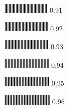 \documentclass{article}
\begin{document}
%
%
%
%



%
%
%
%



%
%

\includegraphics[width=0.91in]{bw_interlaced_horizontal.png} 0.91

\includegraphics[width=0.92in]{bw_interlaced_horizontal.png} 0.92

\includegraphics[width=0.93in]{bw_interlaced_horizontal.png} 0.93

\includegraphics[width=0.94in]{bw_interlaced_horizontal.png} 0.94

\includegraphics[width=0.95in]{bw_interlaced_horizontal.png} 0.95

\includegraphics[width=0.96in]{bw_interlaced_horizontal.png} 0.96
\end{document}
